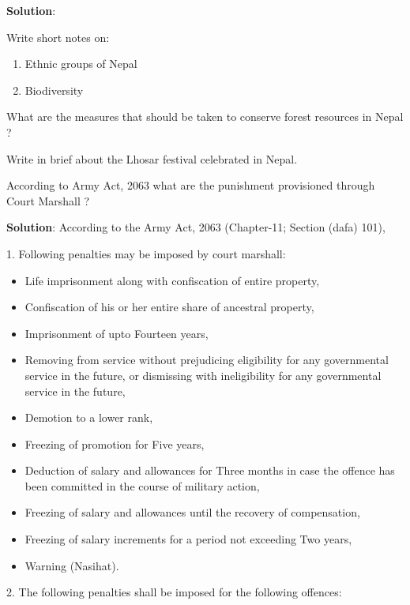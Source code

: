 \documentclass[
  openany]{book}
\newcommand{\question}{\item}
\newenvironment{solution}{ {\bfseries Solution}:}{}
\begin{document}
\begin{questions}
\begin{solution}
\end{solution}

\question Write short notes on:

\begin{enumerate}[label=(\roman*)]
\item Ethnic groups of Nepal
\item Biodiversity
\end{enumerate}

\question What are the measures that should be taken to conserve forest resources in Nepal ?

\question Write in brief about the Lhosar festival celebrated in Nepal.

\question According to Army Act, 2063 what are the punishment provisioned through Court Marshall ?

\begin{solution}
According to the Army Act, 2063 (Chapter-11; Section (dafa) 101), 

1. Following penalties may be imposed by court marshall:

\begin{itemize}
\item Life imprisonment along with confiscation of entire property,
\item Confiscation of his or her entire share of ancestral property,
\item Imprisonment of upto Fourteen years,
\item Removing from service without prejudicing eligibility for any governmental service in the future, or dismissing with ineligibility for any governmental service in the future,
\item Demotion to a lower rank,
\item Freezing of promotion for Five years,
\item Deduction of salary and allowances for Three months in case the offence has been committed in the course of military action,
\item Freezing of salary and allowances until the recovery of compensation,
\item Freezing of salary increments for a period not  exceeding Two years,
\item Warning (Nasihat).
\end{itemize}

2. The following penalties shall be imposed for the following offences:


\end{solution}
\end{questions}
\end{document}
